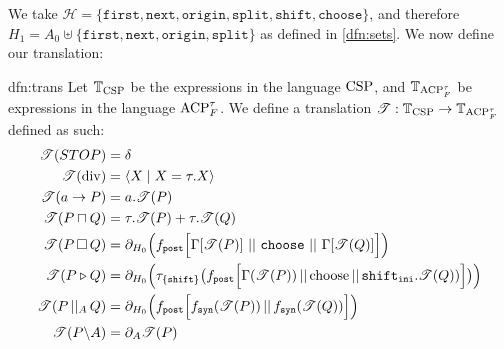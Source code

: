 \documentclass[../hons_project.tex]{subfiles}
\begin{document}
We take $\mathscr{H} = \{\mathtt{first}, \mathtt{next}, \mathtt{origin}, \mathtt{split}, \mathtt{shift}, \mathtt{choose}\}$, and therefore $H_{1} = A_{0} \uplus \{\mathtt{first}, \mathtt{next}, \mathtt{origin}, \mathtt{split}\}$ as defined in \ref{dfn:sets}. We now define our translation:

\newpage
\begin{dfn}{dfn:trans}{}
	Let $\mathbb{T}_{\mathrm{CSP}}$ be the expressions in the language $\mathrm{CSP}$, and $\mathbb{T}_{\mathrm{ACP}_{F}^{\tau}}$ be expressions in the language $\mathrm{ACP}_{F}^{\tau}$. We define a translation $\mathscr{T} : \mathbb{T}_{\mathrm{CSP}} \to \mathbb{T}_{\mathrm{ACP}_{F}^{\tau}}$ defined as such:
	\begin{align*}
		\trans{STOP}           & = \delta                                                                                                                                                                                     \\
		\trans{\mathrm{div}}   & = \langle X \mid X = \tau.X \rangle                                                                                                                                                          \\
		\trans{a \to P}        & = a.\trans{P}                                                                                                                                                                                \\
		\trans{P \intchoice Q} & = \tau.\trans{P} + \tau.\trans{Q}                                                                                                                                                            \\
		\trans{P \extchoice Q} & = \partial_{H_{0}}\Bigl(\fdef{post}\Bigl[\Gamma[\trans{P}]\, \merge \,\mathtt{choose}\, \merge \,\Gamma[\trans{Q}]\Bigl]\Bigr)                                                               \\
		\trans{P \sliding Q}   & = \partial_{H_{0}}\Bigl(\tau_{\{\mathtt{shift}\}}\bigl(f_{\mathtt{post}}\Bigl[ \Gamma(\trans{P}) \merge \mathrm{choose} \merge \mathtt{shift}_{\mathtt{ini}} . \trans{Q}) \Bigr]\bigr)\Bigr) \\
		\trans{P \pcomp Q}     & = \partial_{H_{0}}\Bigl(\fdef{post}\Bigl[\fdef{syn}(\trans{P}) \merge \fdef{syn}(\trans{Q})\Bigr]\Bigr)                                                                                      \\
		\trans{P \backslash A} & = \partial_{A}{\trans{P}}                                                                                                                                                                    \\

\end{align*}
\end{dfn}
\end{document}
